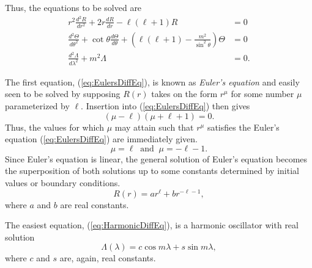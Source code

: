 \documentclass[11pt,dvipsnames]{thesis}
\begin{document}
Thus, the equations to be solved are
\begin{align}
r^2 \frac{d^2 R}{dr^2} + 2r \frac{d R}{dr} - \ell(\ell + 1)R &= 0 \label{eq:EulersDiffEq} \\
\frac{d^2 \Theta}{d\theta^2} + \cot\theta \frac{d\Theta}{d\theta} + \left(\ell(\ell + 1) - \frac{m^2}{\sin^2\theta}\right) \Theta &= 0 \label{eq:LegendresDiffEq} \\
\frac{d^2\Lambda}{d\lambda^2} + m^2 \Lambda &= 0. \label{eq:HarmonicDiffEq}
\end{align}

The first equation, (\ref{eq:EulersDiffEq}), is known as \textit{Euler's equation} and easily seen to be solved by supposing $R(r)$ takes on the form $r^\mu$ for some number $\mu$ parameterized by $\ell$. Insertion into (\ref{eq:EulersDiffEq}) then gives %
\begin{equation}
(\mu - \ell)(\mu + \ell + 1) = 0.
\end{equation}
Thus, the values for which $\mu$ may attain such that $r^\mu$ satisfies the Euler's equation (\ref{eq:EulersDiffEq}) are immediately given.
\begin{equation}
\mu = \ell \ \text{ and } \ \mu = -\ell - 1.
\end{equation}
Since Euler's equation is linear, the general solution of Euler's equation becomes the superposition of both solutions up to some constants determined by initial values or boundary conditions.
\begin{equation}
R(r) = a r^\ell + b r^{-\ell - 1},
\end{equation}
where $a$ and $b$ are real constants.

The easiest equation, (\ref{eq:HarmonicDiffEq}), is a harmonic oscillator with real solution
\begin{equation}
\Lambda(\lambda) = c \cos m\lambda + s \sin m\lambda,
\end{equation}
where $c$ and $s$ are, again, real constants.
\end{document}
